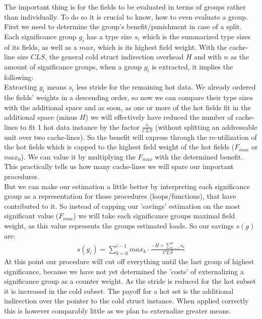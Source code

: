 The important thing is for the fields to be evaluated in terms of groups rather than individually. To do so it is crucial to know, how to even evaluate a group. First we need to determine the group's benefit/punishment in case of a split. Each significance group $g_i$ has a type size $s_i$ which is the summarized type sizes of its fields, as well as a $max_i$ which is its highest field weight. With the cache-line size $CLS$, the general cold struct indirection overhead $H$ and with $n$ as the amount of significance groups, when a group $g_i$ is extracted, it implies the following:\\
Extracting $g_i$ means $s_i$ less stride for the remaining hot data. We already ordered the fields' weights in a descending order, so now we can compare their type sizes with the additional space and as soon, as one or more of the hot fields fit in the additional space (minus $H$) we will effectively have reduced the number of cache-lines to fit 1 hot data instance by the factor $\frac{s_i}{CLS}$ (without splitting an addressable unit over two cache-lines). So the benefit will express through the re-utilization of the hot fields which is capped to the highest field weight of the hot fields ($F_{max}$ or $max_0$). We can value it by multiplying the $F_{max}$ with the determined benefit. This practically tells us how many cache-lines we will spare our important procedures.\\
But we can make our estimation a little better by interpreting each significance group as a representation for those procedures (loops/functions), that have contributed to it. So instead of capping our 'savings' estimation on the most significant value ($F_{max}$) we will take each significance groups maximal field weight, as this value represents the groups estimated loads. So our savings $s(g)$ are:
\begin{align}
	s(g_i) = \sum_{k=0}^{i-1}max_k\cdot\frac{-H+\sum_{k=i}^{n}s_k}{CLS}
\end{align}
At this point our procedure will cut off everything until the last group of highest significance, because we have not yet determined the 'costs' of externalizing a significance group as a counter weight. As the stride is reduced for the hot subset it is increased in the cold subset. The payoff for a hot set is the additional indirection over the pointer to the cold struct instance. When applied correctly this is however comparably little as we plan to externalize greater means.\\
